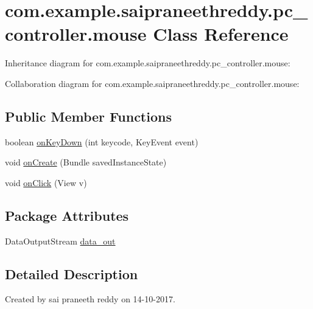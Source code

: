 \hypertarget{classcom_1_1example_1_1saipraneethreddy_1_1pc__controller_1_1mouse}{}\section{com.\+example.\+saipraneethreddy.\+pc\+\_\+controller.\+mouse Class Reference}
\label{classcom_1_1example_1_1saipraneethreddy_1_1pc__controller_1_1mouse}


Inheritance diagram for com.\+example.\+saipraneethreddy.\+pc\+\_\+controller.\+mouse\+:


Collaboration diagram for com.\+example.\+saipraneethreddy.\+pc\+\_\+controller.\+mouse\+:
\subsection*{Public Member Functions}
\begin{DoxyCompactItemize}
\item 
boolean \hyperlink{classcom_1_1example_1_1saipraneethreddy_1_1pc__controller_1_1mouse_a435791487c13c0bb17e4b11780123a8c}{on\+Key\+Down} (int keycode, Key\+Event event)
\item 
void \hyperlink{classcom_1_1example_1_1saipraneethreddy_1_1pc__controller_1_1mouse_a758c81d46996fb9af41a554710b0a02d}{on\+Create} (Bundle saved\+Instance\+State)
\item 
void \hyperlink{classcom_1_1example_1_1saipraneethreddy_1_1pc__controller_1_1mouse_ac27bb4b5bdaafb46eafa7d1ce325dc82}{on\+Click} (View v)
\end{DoxyCompactItemize}
\subsection*{Package Attributes}
\begin{DoxyCompactItemize}
\item 
Data\+Output\+Stream \hyperlink{classcom_1_1example_1_1saipraneethreddy_1_1pc__controller_1_1mouse_a6046ed8b1e002e031b0921d29191a271}{data\+\_\+out}
\end{DoxyCompactItemize}


\subsection{Detailed Description}
Created by sai praneeth reddy on 14-\/10-\/2017. 

